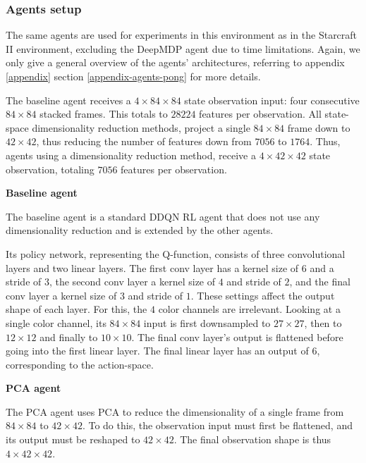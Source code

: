 \subsubsection*{Agents setup}
The same agents are used for experiments in this environment as in the Starcraft II environment, excluding the DeepMDP agent due to time limitations. Again, we only give a general overview of the agents' architectures, referring to appendix \ref{appendix} section \ref{appendix-agents-pong} for more details.

The baseline agent receives a $4 \times 84 \times 84$ state observation input: four consecutive $84 \times 84$ stacked frames. This totals to $28224$ features per observation. All state-space dimensionality reduction methods, project a single $84 \times 84$ frame down to $42 \times 42$, thus reducing the number of features down from $7056$ to $1764$. Thus, agents using a dimensionality reduction method, receive a $4 \times 42 \times 42$ state observation, totaling $7056$ features per observation. \newline\par

\noindent \textbf{Baseline agent}\par
\noindent The baseline agent is a standard DDQN RL agent that does not use any dimensionality reduction and is extended by the other agents.

Its policy network, representing the Q-function, consists of three convolutional layers and two linear layers. The first conv layer has a kernel size of $6$ and a stride of $3$, the second conv layer a kernel size of $4$ and stride of $2$, and the final conv layer a kernel size of $3$ and stride of $1$. These settings affect the output shape of each layer. For this, the $4$ color channels are irrelevant. Looking at a single color channel, its $84 \times 84$ input is first downsampled to $27 \times 27$, then to $12 \times 12$ and finally to $10 \times 10$. The final conv layer's output is flattened before going into the first linear layer. The final linear layer has an output of $6$, corresponding to the action-space.\newline\par

\noindent \textbf{PCA agent}\par
\noindent The PCA agent uses PCA to reduce the dimensionality of a single frame from $84 \times 84$ to $42 \times 42$. To do this, the observation input must first be flattened, and its output must be reshaped to $42 \times 42$. The final observation shape is thus $4 \times 42 \times 42$.

